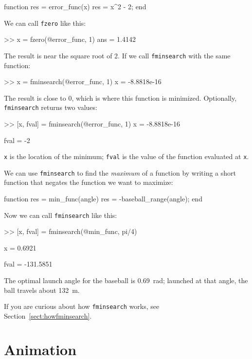 \documentclass[
]{book}
\numberwithin{Answer}{chapter}
\numberwithin{Exercise}{chapter}
\begin{document}
\begin{code}
function res = error_func(x)
    res = x^2 - 2;
end
\end{code}

We can call {\tt fzero} like this:

\begin{code}
>> x = fzero(@error_func, 1)
ans = 1.4142
\end{code}

The result is near the square root of 2.  If we call {\tt fminsearch} with the same function:

\begin{code}
>> x = fminsearch(@error_func, 1)
x = -8.8818e-16
\end{code}

The result is close to 0, which is where this function is minimized.  Optionally, {\tt fminsearch} returns two values:

\begin{code}
>> [x, fval] = fminsearch(@error_func, 1)
x = -8.8818e-16

fval = -2
\end{code}

{\tt x} is the location of the minimum; {\tt fval} is the value of the function evaluated at {\tt x}.

We can use {\tt fminsearch} to find the {\em maximum} of a function by writing a short function that negates the function we want to maximize:

\begin{code}
function res = min_func(angle)
    res = -baseball_range(angle);
end
\end{code}

Now we can call {\tt fminsearch} like this:

\begin{code}
>> [x, fval] = fminsearch(@min_func, pi/4)

x = 0.6921

fval = -131.5851
\end{code}

The optimal launch angle for the baseball is \SI{0.69}{\radian}; launched at that angle, the ball travels about \SI{132}{\meter}.

If you are curious about how {\tt fminsearch} works, see Section~\ref{sect:howfminsearch}.


\section{Animation}
\end{document}
